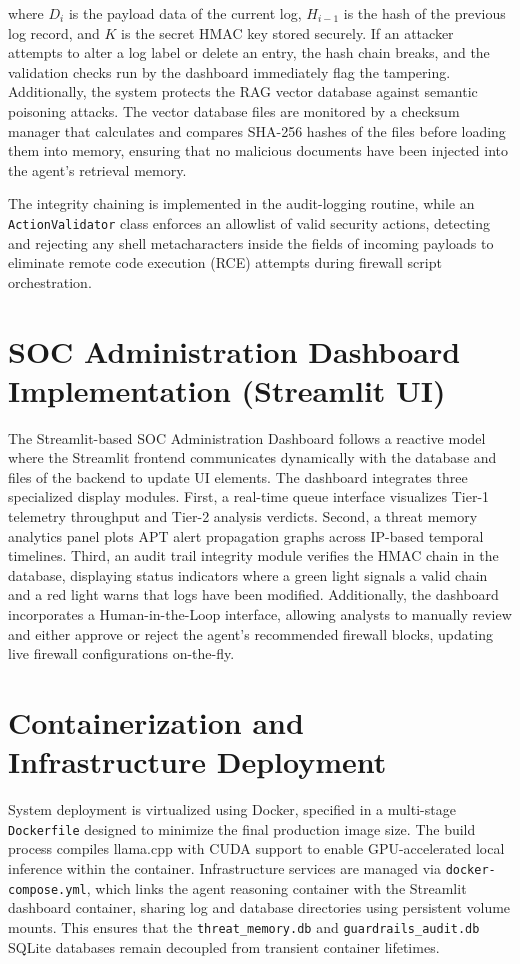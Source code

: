 where $D_i$ is the payload data of the current log, $H_{i-1}$ is the hash of the previous log record, and $K$ is the secret HMAC key stored securely. If an attacker attempts to alter a log label or delete an entry, the hash chain breaks, and the validation checks run by the dashboard immediately flag the tampering. Additionally, the system protects the RAG vector database against semantic poisoning attacks. The vector database files are monitored by a checksum manager that calculates and compares SHA-256 hashes of the files before loading them into memory, ensuring that no malicious documents have been injected into the agent's retrieval memory.

The integrity chaining is implemented in the audit-logging routine, while an \texttt{ActionValidator} class enforces an allowlist of valid security actions, detecting and rejecting any shell metacharacters inside the fields of incoming payloads to eliminate remote code execution (RCE) attempts during firewall script orchestration.

\section{SOC Administration Dashboard Implementation (Streamlit UI)}

The Streamlit-based SOC Administration Dashboard follows a reactive model where the Streamlit frontend communicates dynamically with the database and files of the backend to update UI elements. The dashboard integrates three specialized display modules. First, a real-time queue interface visualizes Tier-1 telemetry throughput and Tier-2 analysis verdicts. Second, a threat memory analytics panel plots APT alert propagation graphs across IP-based temporal timelines. Third, an audit trail integrity module verifies the HMAC chain in the database, displaying status indicators where a green light signals a valid chain and a red light warns that logs have been modified. Additionally, the dashboard incorporates a Human-in-the-Loop interface, allowing analysts to manually review and either approve or reject the agent's recommended firewall blocks, updating live firewall configurations on-the-fly.

\section{Containerization and Infrastructure Deployment}

System deployment is virtualized using Docker, specified in a multi-stage \texttt{Dockerfile} designed to minimize the final production image size. The build process compiles llama.cpp with CUDA support to enable GPU-accelerated local inference within the container. Infrastructure services are managed via \texttt{docker-compose.yml}, which links the agent reasoning container with the Streamlit dashboard container, sharing log and database directories using persistent volume mounts. This ensures that the \texttt{threat\_memory.db} and \texttt{guardrails\_audit.db} SQLite databases remain decoupled from transient container lifetimes.


